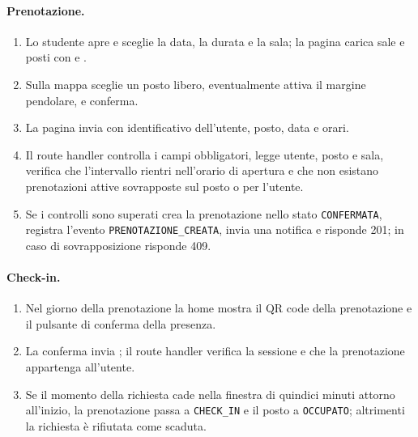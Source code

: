 \documentclass[11pt,a4paper,oneside,openany]{book}
\begin{document}
\paragraph{Prenotazione.}
\begin{enumerate}
  \item Lo studente apre  e sceglie la data, la durata e la sala;
        la pagina carica sale e posti con  e
        .
  \item Sulla mappa sceglie un posto libero, eventualmente attiva il margine
        pendolare, e conferma.
  \item La pagina invia  con identificativo
        dell'utente, posto, data e orari.
  \item Il route handler controlla i campi obbligatori, legge utente, posto e
        sala, verifica che l'intervallo rientri nell'orario di apertura e che
        non esistano prenotazioni attive sovrapposte sul posto o per l'utente.
  \item Se i controlli sono superati crea la prenotazione nello stato
        \texttt{CONFERMATA}, registra l'evento \texttt{PRENOTAZIONE\_CREATA},
        invia una notifica e risponde 201; in caso di sovrapposizione risponde
        409.
\end{enumerate}


\paragraph{Check-in.}
\begin{enumerate}
  \item Nel giorno della prenotazione la home mostra il QR code della
        prenotazione e il pulsante di conferma della presenza.
  \item La conferma invia ; il
        route handler verifica la sessione e che la prenotazione appartenga
        all'utente.
  \item Se il momento della richiesta cade nella finestra di quindici minuti
        attorno all'inizio, la prenotazione passa a \texttt{CHECK\_IN} e il
        posto a \texttt{OCCUPATO}; altrimenti la richiesta è rifiutata come
        scaduta.
\end{enumerate}

\end{document}
